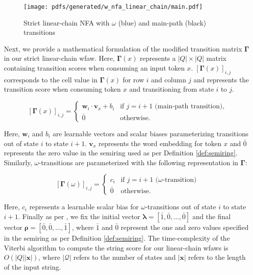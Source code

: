 \begin{figure}[t!]
  \centering
  \texttt{[image: pdfs/generated/w\_nfa\_linear\_chain/main.pdf]}
  \caption{Strict linear-chain NFA with
    $\omega$ (blue) and main-path (black) transitions}
  \label{fig:omega_fa}
\end{figure}

Next, we provide a mathematical formulation of the modified transition matrix
$\bm{\Gamma}$ in our strict linear-chain \ac{wfaw}. Here, $\bm{\Gamma}(x)$ represents a
$|Q|\times|Q|$ matrix containing transition scores when consuming an input token
$x$. $[\bm{\Gamma}(x)]_{i,j}$ corresponds to the cell value in $\bm{\Gamma}(x)$ for row
$i$ and column $j$ and represents the transition score when consuming token $x$
and transitioning from state $i$ to $j$.

\begin{equation}
  \label{eq:spp_transition_matrix_main}
  [\bm{\Gamma}(x)]_{i,j} =
  \begin{cases}
    \bm{w}_i \cdot \bm{v}_x + b_i  & \text{if } j = i + 1 \text{ (main-path transition),} \\
    \bar{0} & \text{otherwise.}
  \end{cases}
\end{equation}

Here, $\bm{w}_i$ and $b_i$ are learnable vectors and scalar biases
parameterizing transitions out of state $i$ to state $i+1$. $\bm{v}_x$
represents the word embedding for token $x$ and $\bar{0}$ represents the zero
value in the semiring used as per Definition \ref{def:semiring}. Similarly,
$\omega$-transitions are parameterized with the following representation in
$\bm{\Gamma}$:

\begin{equation}
  \label{eq:spp_transition_matrix_omega}
  [\bm{\Gamma}(\omega)]_{i,j} =
  \begin{cases}
    c_i  & \text{if } j = i + 1 \text{ ($\omega$-transition)} \\
    \bar{0} & \text{otherwise.}
  \end{cases}
\end{equation}

Here, $c_i$ represents a learnable scalar bias for $\omega$-transitions out of
state $i$ to state $i+1$. Finally as per \citet{schwartz2018sopa}, we fix the
initial vector $\bm{\lambda} = [\bar{1}, \bar{0}, \ldots, \bar{0}]$ and the final
vector $\bm{\rho} = [\bar{0}, \bar{0}, \ldots, \bar{1}]$, where $\bar{1}$ and
$\bar{0}$ represent the one and zero values specified in the semiring as per
Definition \ref{def:semiring}. The time-complexity of the Viterbi algorithm to
compute the string score for our linear-chain \ac{wfaws} is
$O(|Q||\bm{x}|)$, where $|\mathcal{Q}|$ refers to the number of states and
$|\bm{x}|$ refers to the length of the input string.

